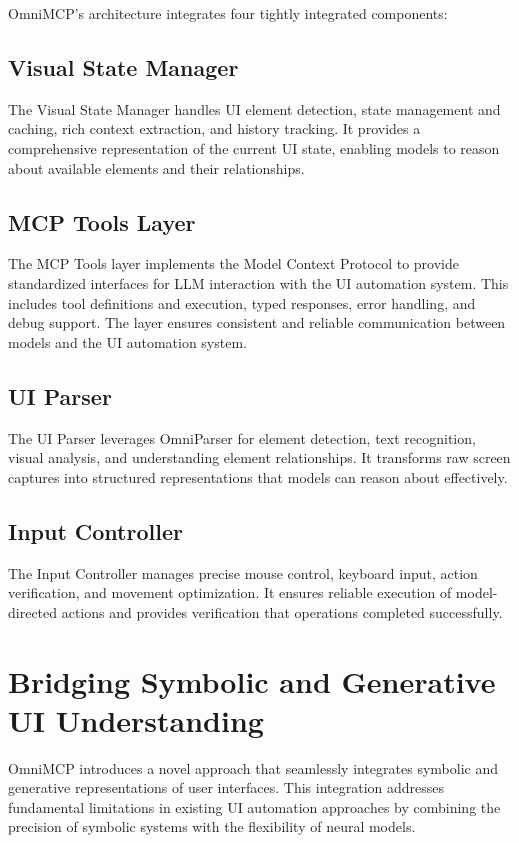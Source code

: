 \documentclass{article}
\begin{document}
OmniMCP's architecture integrates four tightly integrated components:

\subsection{Visual State Manager}
The Visual State Manager handles UI element detection, state management and caching, rich context extraction, and history tracking. It provides a comprehensive representation of the current UI state, enabling models to reason about available elements and their relationships.

\subsection{MCP Tools Layer}
The MCP Tools layer implements the Model Context Protocol to provide standardized interfaces for LLM interaction with the UI automation system. This includes tool definitions and execution, typed responses, error handling, and debug support. The layer ensures consistent and reliable communication between models and the UI automation system.

\subsection{UI Parser}
The UI Parser leverages OmniParser for element detection, text recognition, visual analysis, and understanding element relationships. It transforms raw screen captures into structured representations that models can reason about effectively.

\subsection{Input Controller}
The Input Controller manages precise mouse control, keyboard input, action verification, and movement optimization. It ensures reliable execution of model-directed actions and provides verification that operations completed successfully.

\section{Bridging Symbolic and Generative UI Understanding}

OmniMCP introduces a novel approach that seamlessly integrates symbolic and generative representations of user interfaces. This integration addresses fundamental limitations in existing UI automation approaches by combining the precision of symbolic systems with the flexibility of neural models.
\end{document}
